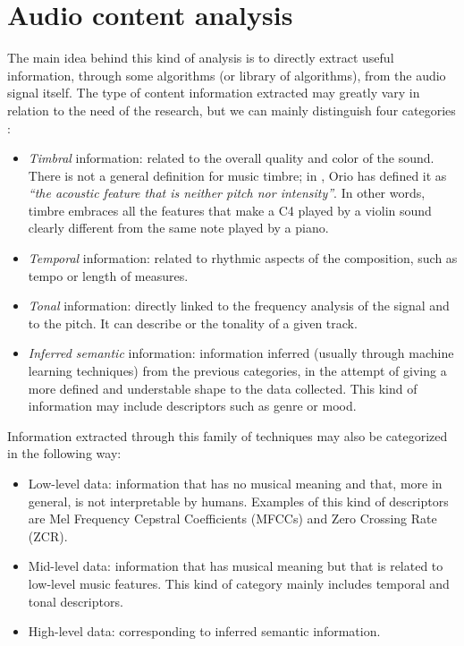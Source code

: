 \section{Audio content analysis}
The main idea behind this kind of analysis is to directly extract useful information, through some algorithms (or library of algorithms), from the audio signal itself. The type of content information extracted may greatly vary in relation to the need of the research, but we can mainly distinguish four categories \cite{bogdanov13}:
\begin{itemize}
\item \textit{Timbral} information: related to the overall quality and color of the sound. There is not a general definition for music timbre; in \cite{orio06}, Orio has defined it as \textit{``the acoustic feature that is neither pitch nor intensity''}. In other words, timbre embraces all the features that make a C4 played by a violin sound clearly different from the same note played by a piano.
\item \textit{Temporal} information: related to rhythmic aspects of the composition, such as tempo or length of measures.
\item \textit{Tonal} information: directly linked to the frequency analysis of the signal and to the pitch. It can describe  or the tonality of a given track.
\item \textit{Inferred semantic} information: information inferred (usually through machine learning techniques) from the previous categories, in the attempt of giving a more defined and understable shape to the data collected. This kind of information may include descriptors such as genre or mood.
\end{itemize}

Information extracted through this family of techniques may also be categorized in the following way:
\begin{itemize}
\item Low-level data: information that has no musical meaning and that, more in general, is not interpretable by humans. Examples of this kind of descriptors are Mel Frequency Cepstral Coefficients (MFCCs) and Zero Crossing Rate (ZCR).
\item Mid-level data: information that has musical meaning but that is related to low-level music features. This kind of category mainly includes temporal and tonal descriptors. 
\item High-level data: corresponding to inferred semantic information.
\end{itemize}

